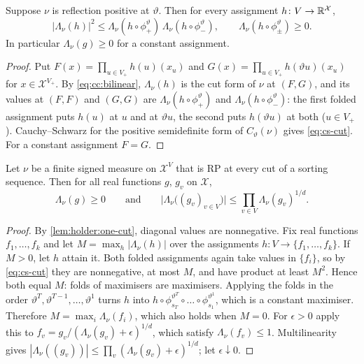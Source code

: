 \begin{lemma}\label{lem:holder:one-cut}
Suppose $\nu$ is reflection positive at $\vartheta$. Then for every assignment
$h\colon V\to\mathbb R^{\mathcal X}$,
\begin{equation}\label{eq:cs-cut}
 |\Lambda_\nu(h)|^2\le\Lambda_\nu(h\circ\phi^\vartheta_+)\,
 \Lambda_\nu(h\circ\phi^\vartheta_-),\qquad
 \Lambda_\nu(h\circ\phi^\vartheta_\pm)\ge0 .
\end{equation}
In particular $\Lambda_\nu(g)\ge0$ for a constant assignment.
\end{lemma}

\begin{proof}
Put $F(x)=\prod_{u\in V_+}h(u)(x_u)$ and $G(x)=\prod_{u\in V_+}h(\vartheta u)(x_u)$
for $x\in\mathcal X^{V_+}$. By \eqref{eq:cc:bilinear}, $\Lambda_\nu(h)$ is the
cut form of $\nu$ at $(F,G)$, and its values at $(F,F)$ and $(G,G)$ are
$\Lambda_\nu(h\circ\phi^\vartheta_+)$ and $\Lambda_\nu(h\circ\phi^\vartheta_-)$:
the first folded assignment puts $h(u)$ at $u$ and at $\vartheta u$, the second
puts $h(\vartheta u)$ at both ($u\in V_+$). Cauchy--Schwarz for the positive
semidefinite form of $C_\vartheta(\nu)$ gives \eqref{eq:cs-cut}. For a constant
assignment $F=G$.
\end{proof}

\begin{theorem}\label{thm:holder}
Let $\nu$ be a finite signed measure on $\mathcal X^V$ that is RP at every cut
of a sorting sequence. Then for all real functions $g$, $g_v$ on $\mathcal X$,
\[
 \Lambda_\nu(g)\ge0\qquad\text{and}\qquad
 \big|\Lambda_\nu\big((g_v)_{v\in V}\big)\big|\le\prod_{v\in V}\Lambda_\nu(g_v)^{1/d}.
\]
\end{theorem}

\begin{proof}
By \cref{lem:holder:one-cut}, diagonal values are nonnegative. Fix real
functions $f_1,\dots,f_k$ and let $M=\max_h|\Lambda_\nu(h)|$ over the
assignments $h\colon V\to\{f_1,\dots,f_k\}$. If $M>0$, let $h$ attain it. Both
folded assignments again take values in $\{f_i\}$, so by \eqref{eq:cs-cut}
they are nonnegative, at most $M$, and have product at least $M^2$. Hence both
equal $M$: folds of maximisers are maximisers. Applying the folds in the order
$\vartheta^T,\vartheta^{T-1},\dots,\vartheta^1$ turns $h$ into
$h\circ\phi^{\vartheta^T}_{s_T}\circ\dots\circ\phi^{\vartheta^1}_{s_1}$, which is a
constant maximiser. Therefore $M=\max_i\Lambda_\nu(f_i)$, which also holds when
$M=0$. For $\epsilon>0$ apply this to
$f_v=g_v/(\Lambda_\nu(g_v)+\epsilon)^{1/d}$, which satisfy $\Lambda_\nu(f_v)\le1$.
Multilinearity gives
$|\Lambda_\nu((g_v))|\le\prod_v(\Lambda_\nu(g_v)+\epsilon)^{1/d}$; let
$\epsilon\downarrow0$.
\end{proof}

